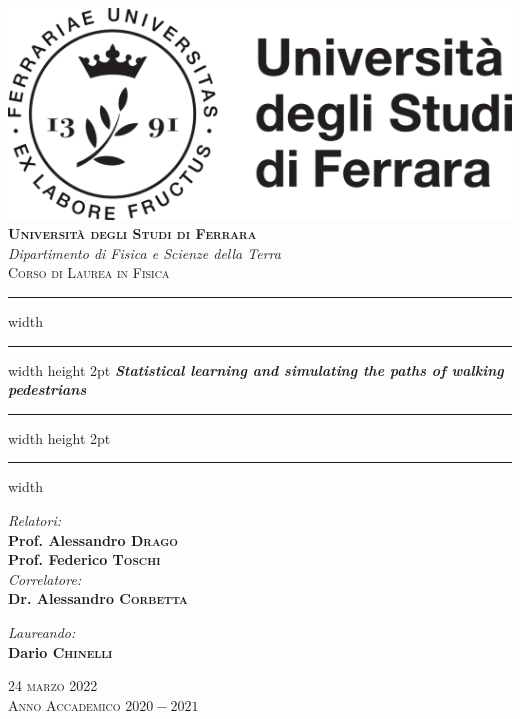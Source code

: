 \documentclass[10pt,a4paper]{report}
\begin{document}
\begin{titlepage}
	\centering
	\vspace*{15mm}
	\includegraphics[]{logo.png} \\
	\vspace*{15mm}
	\huge \textbf{\textsc{Università degli Studi di Ferrara}} \\
	\Large \textit{Dipartimento di Fisica e Scienze della Terra} \\
	\Large \textsc{Corso di Laurea in Fisica}
	
	\vspace*{1.2cm}
	\hrule width \hsize \kern 1mm \hrule width \hsize height 2pt
	\vspace*{10mm}
	\Huge \emph{\textbf{Statistical learning and simulating the paths of walking pedestrians}}
	\vspace*{10mm}
	\hrule width \hsize height 2pt
	\vspace*{1mm}
	\hrule width \hsize \kern 1mm
	
	\vspace*{12mm}
	\begin{minipage}{0.45\textwidth}
		\begin{flushleft} \Large
			\emph{Relatori:}\\
			\Large \textbf{Prof. Alessandro \textsc{Drago}}\\
			\Large \textbf{Prof. Federico \textsc{Toschi}}\\
			\vspace*{5mm}
			\emph{Correlatore:}\\
			\Large \textbf{Dr. Alessandro \textsc{Corbetta}}
		\end{flushleft}
	\end{minipage}
	\begin{minipage}{0.45\textwidth}
		\begin{flushright} \Large
			\emph{Laureando:} \\
			\Large \textbf{Dario \textsc{Chinelli}}
		\end{flushright}
	\end{minipage}
	
	\vspace*{16mm}
	\Large \textsc{24 marzo 2022}\\
	\vspace*{5mm}
	\Large \textsc{Anno Accademico $2020-2021$}
\end{titlepage}
\restoregeometry
\end{document}
